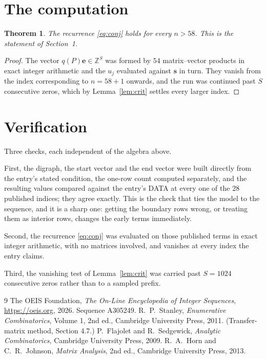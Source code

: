 \documentclass[11pt,a4paper]{article}
\theoremstyle{plain}
\newtheorem{theorem}{Theorem}
\theoremstyle{definition}
\begin{document}
\section{The computation}

\begin{theorem}
The recurrence \eqref{eq:conj} holds for every $n>58$. This is the statement of
Section~1.
\end{theorem}

\begin{proof}
The vector $q(P)\mathbf{e}\in\mathbb{Z}^{S}$ was formed by $54$ matrix--vector
products in exact integer arithmetic and the $u_j$ evaluated against $\mathbf{s}$ in turn.
They vanish from the index corresponding to $n=58+1$ onwards, and the run was continued
past $S$ consecutive zeros, which by Lemma~\ref{lem:crit} settles every larger index.
\end{proof}

\section{Verification}

Three checks, each independent of the algebra above.

First, the digraph, the start vector and the end vector were built directly from the
entry's stated condition, the one-row count computed separately, and the resulting values
compared against the entry's DATA at every one of the $28$ published indices; they
agree exactly. This is the check that ties the model to the sequence, and it is a sharp one:
getting the boundary rows wrong, or treating them as interior rows, changes the early terms
immediately.

Second, the recurrence \eqref{eq:conj} was evaluated on those published terms in exact
integer arithmetic, with no matrices involved, and vanishes at every index the entry claims.

Third, the vanishing test of Lemma~\ref{lem:crit} was carried past $S=1024$ consecutive
zeros rather than to a sampled prefix.

\begin{thebibliography}{9}
 The OEIS Foundation, \emph{The On-Line Encyclopedia of Integer
Sequences}, \url{https://oeis.org}, 2026. Sequence A305249.
 R.~P.~Stanley, \emph{Enumerative Combinatorics}, Volume 1, 2nd ed.,
Cambridge University Press, 2011. (Transfer-matrix method, Section 4.7.)
 P.~Flajolet and R.~Sedgewick, \emph{Analytic Combinatorics}, Cambridge
University Press, 2009.
 R.~A.~Horn and C.~R.~Johnson, \emph{Matrix Analysis}, 2nd ed., Cambridge
University Press, 2013.
\end{thebibliography}
\end{document}
